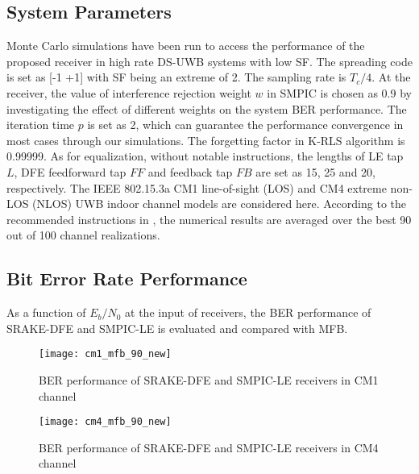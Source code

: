 \documentclass[journal]{IEEEtran}
\begin{document}
\subsection{System Parameters}
Monte Carlo simulations have been run to access the performance of
the proposed receiver in high rate DS-UWB systems with low SF. The
spreading code is set as [-1 +1] with SF being an extreme of 2. The
sampling rate is $T_c/4$. At the receiver, the value of interference
rejection weight $w$ in SMPIC is chosen as 0.9 by investigating the
effect of different weights on the system BER performance. The
iteration time $p$ is set as 2, which can guarantee the performance
convergence in most cases through our simulations. The forgetting
factor in K-RLS algorithm is 0.99999. As for equalization, without
notable instructions, the lengths of LE tap $L$, DFE feedforward tap
$FF$ and feedback tap $FB$ are set as 15, 25 and 20, respectively.
The IEEE 802.15.3a CM1 line-of-sight (LOS) and CM4 extreme non-LOS
(NLOS) UWB indoor channel models are considered here. According to
the recommended instructions in \cite{Channel}, the numerical
results are averaged over the best 90 out of 100 channel
realizations.




\subsection{Bit Error Rate Performance}

As a function of $E_b/N_0$ at the input of receivers, the BER
performance of SRAKE-DFE and SMPIC-LE is evaluated and compared with
MFB.

\begin{figure}[t]
\begin{center}
  \texttt{[image: cm1\_mfb\_90\_new]}
  \caption{BER performance of SRAKE-DFE and SMPIC-LE receivers in CM1 channel}
  \label{cm1}
\end{center}
\end{figure}



\begin{figure}[t]
\begin{center}
  \texttt{[image: cm4\_mfb\_90\_new]}
  \caption{BER performance of SRAKE-DFE and SMPIC-LE receivers in CM4 channel}
  \label{cm4}
\end{center}
\end{figure}
\end{document}
